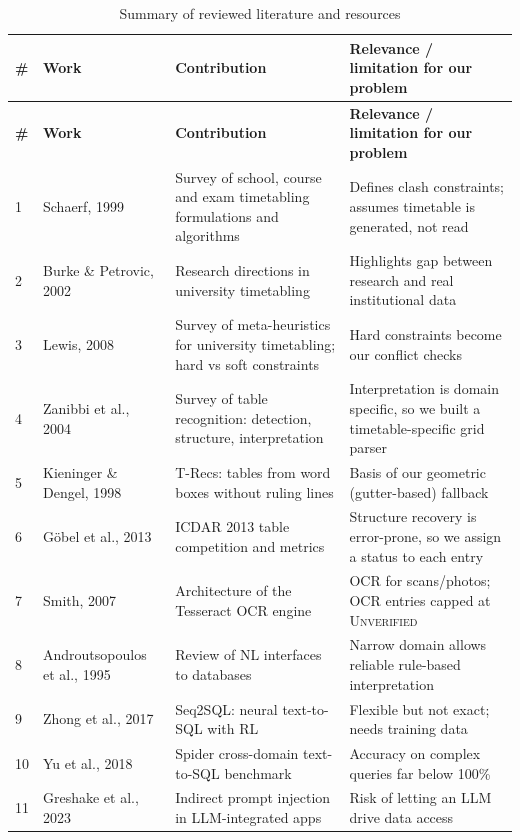 \begin{longtable}{@{}p{0.6cm}p{3.6cm}p{5.4cm}p{5.6cm}@{}}
\caption{Summary of reviewed literature and resources}\label{tab:litreview}\\
\toprule
\textbf{\#} & \textbf{Work} & \textbf{Contribution} & \textbf{Relevance / limitation for our problem}\\
\midrule
\endfirsthead
\toprule
\textbf{\#} & \textbf{Work} & \textbf{Contribution} & \textbf{Relevance / limitation for our problem}\\
\midrule
\endhead
1 & Schaerf, 1999~\cite{schaerf1999} & Survey of school, course and exam timetabling formulations and algorithms & Defines clash constraints; assumes timetable is generated, not read\\
2 & Burke \& Petrovic, 2002~\cite{burke2002} & Research directions in university timetabling & Highlights gap between research and real institutional data\\
3 & Lewis, 2008~\cite{lewis2008} & Survey of meta-heuristics for university timetabling; hard vs soft constraints & Hard constraints become our conflict checks\\
4 & Zanibbi et al., 2004~\cite{zanibbi2004} & Survey of table recognition: detection, structure, interpretation & Interpretation is domain specific, so we built a timetable-specific grid parser\\
5 & Kieninger \& Dengel, 1998~\cite{kieninger1998} & T-Recs: tables from word boxes without ruling lines & Basis of our geometric (gutter-based) fallback\\
6 & G\"obel et al., 2013~\cite{gobel2013} & ICDAR 2013 table competition and metrics & Structure recovery is error-prone, so we assign a status to each entry\\
7 & Smith, 2007~\cite{smith2007} & Architecture of the Tesseract OCR engine & OCR for scans/photos; OCR entries capped at \textsc{Unverified}\\
8 & Androutsopoulos et al., 1995~\cite{androutsopoulos1995} & Review of NL interfaces to databases & Narrow domain allows reliable rule-based interpretation\\
9 & Zhong et al., 2017~\cite{zhong2017} & Seq2SQL: neural text-to-SQL with RL & Flexible but not exact; needs training data\\
10 & Yu et al., 2018~\cite{yu2018} & Spider cross-domain text-to-SQL benchmark & Accuracy on complex queries far below 100\%\\
11 & Greshake et al., 2023~\cite{greshake2023} & Indirect prompt injection in LLM-integrated apps & Risk of letting an LLM drive data access\\

\end{longtable}

